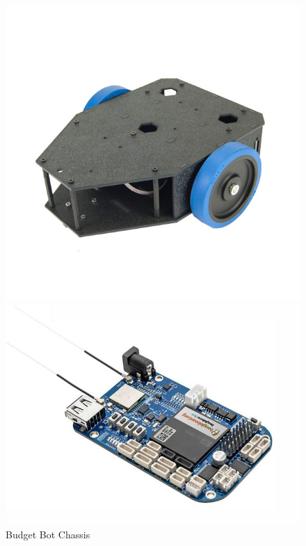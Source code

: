 \begin{figure}
  \centering
  \begin{minipage}[t]{0.32\textwidth}
    \includegraphics[width=1\textwidth]{figs/img/budgetbot_chassis}
    \captionsetup{width=\textwidth}
    \caption{Budget Bot Chassis}
    \label{fig:budgetBotChassis}
  \end{minipage}%
  \begin{minipage}[t]{0.32\textwidth}
    \includegraphics[width=1\textwidth]{figs/img/beaglebone_blue}

\end{minipage}
\end{figure}
